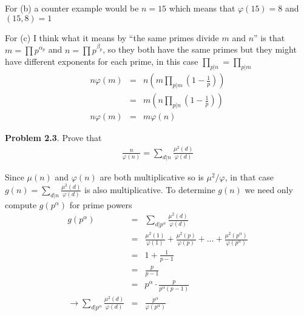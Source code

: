\documentclass[aps,preprint,preprintnumbers,nofootinbib,showpacs,prd]{revtex4-1}
\newcommand{\nbea}{\begin{eqnarray*}}
\newcommand{\neea}{\end{eqnarray*}}
\begin{document}
For (b) a counter example would be $n = 15$ which means that $\varphi(15) = 8$ and $(15,8) = 1$

For (c) I think what it means by ``the same primes divide $m$ and $n$'' is that $m = \prod p^{\alpha_p}$ and $n = \prod p^{\beta_p}$, so they both have the same primes but they might have different exponents for each prime, in this case $\prod_{p|n} = \prod_{p|m}$
%
\nbea
n\varphi(m) & = & n \left ( m \prod_{p|m} \left ( 1 - \frac{1}{p}\right ) \right ) \\
& = & m \left ( n \prod_{p|n} \left ( 1 - \frac{1}{p}\right ) \right ) \\
n\varphi(m) & = & m\varphi(n)
\neea
%

{\bf Problem 2.3}. Prove that
%
\nbea
\frac{n}{\varphi(n)} = \sum_{d|n} \frac{\mu^2(d)}{\varphi(d)}
\neea
%

Since $\mu(n)$ and $\varphi(n)$ are both multiplicative so is $\mu^2/\varphi$, in that case $g(n) = \sum_{d|n} \frac{\mu^2(d)}{\varphi(d)}$ is also multiplicative. To determine $g(n)$ we need only compute $g(p^\alpha)$ for prime powers
%
\nbea
g(p^\alpha) & = & \sum_{d|p^\alpha} \frac{\mu^2(d)}{\varphi(d)} \\
& = & \frac{\mu^2(1)}{\varphi(1)} + \frac{\mu^2(p)}{\varphi(p)} + \ldots + \frac{\mu^2(p^\alpha)}{\varphi(p^\alpha)} \\
& = & 1 + \frac{1}{p - 1} \\
& = & \frac{p}{p - 1} \\
& = & p^\alpha \cdot \frac{p}{p^\alpha(p - 1)} \\
\to \sum_{d|p^\alpha} \frac{\mu^2(d)}{\varphi(d)}& = & \frac{p^\alpha}{\varphi(p^\alpha)}
\neea
%
\end{document}
